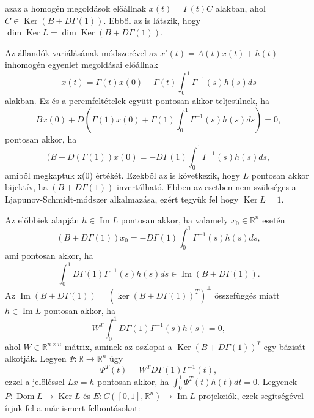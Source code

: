 \documentclass[oneside, titlepage, 12pt, a4paper]{report}
\DeclareMathOperator{\Ima}{Im}	%
\DeclareMathOperator{\Ker}{Ker}	%
\DeclareMathOperator{\Dom}{Dom}	%
\begin{document}
azaz a homogén megoldások előállnak $x(t) = \Gamma(t) C$ alakban, ahol $C \in \Ker (B + D \Gamma(1))$. Ebből az is látszik, hogy $\dim \Ker L = \dim \Ker (B + D \Gamma(1))$. \par
Az állandók variálásának módszerével az $x'(t) = A(t) x(t) + h(t)$ inhomogén egyenlet megoldásai előállnak
\begin{equation*}
x(t) = \Gamma(t) x(0) + \Gamma(t) \int_0^1 \Gamma^{-1}(s) h(s) ds
\end{equation*}
alakban. Ez és a peremfeltételek együtt pontosan akkor teljesülnek, ha
\begin{equation*}
Bx(0) + D(\Gamma(1) x(0) + \Gamma(1) \int_0^1 \Gamma^{-1}(s) h(s) ds) = 0,
\end{equation*}
pontosan akkor, ha
\begin{equation*}
(B + D(\Gamma(1)) x(0) = -D\Gamma(1) \int_0^1 \Gamma^{-1}(s) h(s) ds,
\end{equation*}
amiből megkaptuk x(0) értékét. Ezekből az is következik, hogy $L$ pontosan akkor bijektív, ha $(B + D\Gamma(1))$ invertálható. Ebben az esetben nem szükséges a Ljapunov-Schmidt-módszer alkalmazása, ezért tegyük fel hogy $\Ker L = 1$. \par
Az előbbiek alapján $h \in \Ima L$ pontosan akkor, ha valamely $x_0 \in \mathbb{R}^n$ esetén
\begin{equation*}
(B + D\Gamma(1)) x_0 = - D\Gamma(1) \int_0^1 \Gamma^{-1}(s) h(s) ds,
\end{equation*}
ami pontosan akkor, ha
\begin{equation*}
\int_0^1 D \Gamma(1) \Gamma^{-1}(s) h(s) ds \in \Ima (B + D \Gamma(1)).
\end{equation*}
Az $\Ima (B + D \Gamma(1)) = (\ker(B + D\Gamma(1))^T)^\perp$ összefüggés miatt $h \in \Ima L$ pontosan akkor, ha
\begin{equation*}
W^T \int_0^1 D \Gamma(1) \Gamma^{-1}(s) h(s) = 0,
\end{equation*}
ahol $W \in \mathbb{R}^{n \times n}$ mátrix, aminek az oszlopai a $\Ker (B + D \Gamma(1))^T$ egy bázisát alkotják. Legyen $\Psi : \mathbb{R} \rightarrow \mathbb{R}^n$ úgy
\begin{equation*}
\Psi^T(t) = W^T D \Gamma(1) \Gamma^{-1}(t),
\end{equation*}
ezzel a jelöléssel $Lx = h$ pontosan akkor, ha $\int_0^1 \Psi^T(t) h(t) dt = 0$. Legyenek $P : \Dom L \rightarrow \Ker L$ és $E : C([0, 1], \mathbb{R}^n) \rightarrow \Ima L$ projekciók, ezek segítségével írjuk fel a már ismert felbontásokat:
\end{document}
